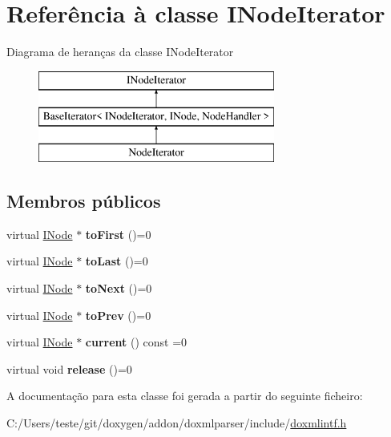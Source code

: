 \hypertarget{class_i_node_iterator}{\section{Referência à classe I\-Node\-Iterator}
\label{class_i_node_iterator}
}
Diagrama de heranças da classe I\-Node\-Iterator\begin{figure}[H]
\begin{center}
\leavevmode
\includegraphics[height=3.000000cm]{class_i_node_iterator}
\end{center}
\end{figure}
\subsection*{Membros públicos}
\begin{DoxyCompactItemize}
\item 
\hypertarget{class_i_node_iterator_a23c7f3336350e6390875dfe7973cef75}{virtual \hyperlink{class_i_node}{I\-Node} $\ast$ {\bfseries to\-First} ()=0}\label{class_i_node_iterator_a23c7f3336350e6390875dfe7973cef75}

\item 
\hypertarget{class_i_node_iterator_aa055f6aea670fdae9927aa2eb23312a2}{virtual \hyperlink{class_i_node}{I\-Node} $\ast$ {\bfseries to\-Last} ()=0}\label{class_i_node_iterator_aa055f6aea670fdae9927aa2eb23312a2}

\item 
\hypertarget{class_i_node_iterator_af3de0e6e1a8b66259750163ad6db3b3d}{virtual \hyperlink{class_i_node}{I\-Node} $\ast$ {\bfseries to\-Next} ()=0}\label{class_i_node_iterator_af3de0e6e1a8b66259750163ad6db3b3d}

\item 
\hypertarget{class_i_node_iterator_a2a4d7fd91a3f2c417d80babb04888ec8}{virtual \hyperlink{class_i_node}{I\-Node} $\ast$ {\bfseries to\-Prev} ()=0}\label{class_i_node_iterator_a2a4d7fd91a3f2c417d80babb04888ec8}

\item 
\hypertarget{class_i_node_iterator_a007bbea14d7e41470822733006b64936}{virtual \hyperlink{class_i_node}{I\-Node} $\ast$ {\bfseries current} () const =0}\label{class_i_node_iterator_a007bbea14d7e41470822733006b64936}

\item 
\hypertarget{class_i_node_iterator_aab0a52fdd148a54108e7bf49287d7c47}{virtual void {\bfseries release} ()=0}\label{class_i_node_iterator_aab0a52fdd148a54108e7bf49287d7c47}

\end{DoxyCompactItemize}


A documentação para esta classe foi gerada a partir do seguinte ficheiro\-:\begin{DoxyCompactItemize}
\item 
C\-:/\-Users/teste/git/doxygen/addon/doxmlparser/include/\hyperlink{include_2doxmlintf_8h}{doxmlintf.\-h}\end{DoxyCompactItemize}
